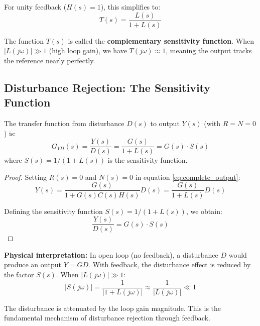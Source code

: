 For unity feedback ($H(s) = 1$), this simplifies to:
\begin{equation}
T(s) = \frac{L(s)}{1 + L(s)}
\end{equation}

The function $T(s)$ is called the \textbf{complementary sensitivity function}. When $|L(j\omega)| \gg 1$ (high loop gain), we have $T(j\omega) \approx 1$, meaning the output tracks the reference nearly perfectly.

\subsection{Disturbance Rejection: The Sensitivity Function}

\begin{theorem}
The transfer function from disturbance $D(s)$ to output $Y(s)$ (with $R = N = 0$) is:
\begin{equation}
G_{YD}(s) = \frac{Y(s)}{D(s)} = \frac{G(s)}{1 + L(s)} = G(s) \cdot S(s)
\label{eq:disturbance_tf}
\end{equation}
where $S(s) = 1/(1 + L(s))$ is the sensitivity function.
\end{theorem}

\begin{proof}
Setting $R(s) = 0$ and $N(s) = 0$ in equation \eqref{eq:complete_output}:
\begin{equation}
Y(s) = \frac{G(s)}{1 + G(s)C(s)H(s)}D(s) = \frac{G(s)}{1 + L(s)}D(s)
\end{equation}

Defining the sensitivity function $S(s) = 1/(1 + L(s))$, we obtain:
\begin{equation}
\frac{Y(s)}{D(s)} = G(s) \cdot S(s)
\end{equation}
\end{proof}

\textbf{Physical interpretation:} In open loop (no feedback), a disturbance $D$ would produce an output $Y = GD$. With feedback, the disturbance effect is reduced by the factor $S(s)$. When $|L(j\omega)| \gg 1$:
\begin{equation}
|S(j\omega)| = \frac{1}{|1 + L(j\omega)|} \approx \frac{1}{|L(j\omega)|} \ll 1
\end{equation}

The disturbance is attenuated by the loop gain magnitude. This is the fundamental mechanism of disturbance rejection through feedback.

